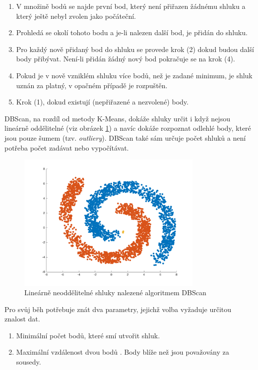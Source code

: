 \documentclass[pdftex,a4paper]{article}
\begin{document}
\begin{enumerate}
	\item V množině bodů se najde první bod, který není přiřazen žádnému shluku a který ještě nebyl zvolen jako počáteční.
	\item Prohledá se \textepsilon{} okolí tohoto bodu a je-li nalezen další bod, je přidán do shluku.
	\item Pro každý nově přidaný bod do shluku se provede krok (2) dokud budou další body přibývat. Není-li přidán žádný nový bod pokračuje se na krok (4).
	\item Pokud je v nově vzniklém shluku více bodů, než je zadané minimum, je shluk uznán za platný, v opačném případě je rozpuštěn. 
	\item Krok (1), dokud existují  (nepřiřazené a nezvolené) body.
\end{enumerate}

DBScan, na rozdíl od metody K-Means, dokáže shluky určit i když nejsou lineárně oddělitelné (viz obrázek \ref{fig:obr2}) a navíc dokáže rozpoznat odlehlé body, které jsou pouze šumem (tzv. \textit{outliery}). DBScan také sám určuje počet shluků a není potřeba počet zadávat nebo vypočítávat.

\begin{figure}[h]
	\centering
	\includegraphics[width=0.8\textwidth]{res/dbscan.png}
	\caption{Lineárně neoddělitelné shluky nalezené algoritmem DBScan}
	\label{fig:obr2}
\end{figure}

\vspace{\baselineskip}

Pro svůj běh potřebuje znát dva parametry, jejichž volba vyžaduje určitou znalost dat.

\begin{enumerate}
	\item Minimální počet bodů, které smí utvořit shluk.
	\item Maximální vzdálenost dvou bodů \textepsilon. Body blíže než \textepsilon{} jsou považovány za sousedy.
\end{enumerate}
\end{document}
